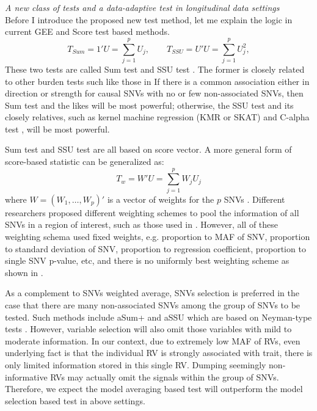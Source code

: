 \documentclass[12pt]{article}
\begin{document}
\textit{A new class of tests and a data-adaptive test in longitudinal data settings}\\
Before I introduce the proposed new test method, let me explain the logic in current GEE and Score test based methods.
$$
T_{Sum} = 1' U = \sum_{j=1}^p U_j, \qquad T_{SSU} = U'U = \sum_{j=1}^p U_j^2,
$$
These two tests are called Sum test and SSU test \cite{Pan2009}. The former is closely related to other burden tests such like those in \cite{Morgenthaler2007,Li2008,Madsen2009} If there is a common association either in direction or strength for causal SNVs with no or few non-associated SNVs, then Sum test and the likes will be most powerful; otherwise, the SSU test and its closely relatives, such as kernel machine regression (KMR or SKAT) \cite{Lee2012,Ionita-Laza2013,Oualkacha2013,Lee2012a,Wu2011} and C-alpha test \cite{Neale2011}, will be most powerful. 

Sum test and SSU test are all based on score vector. A more general form of score-based statistic can be generalized as:
$$
T_w = W' U = \sum_{j=1}^p W_j U_j
$$
where $W = (W_1, \ldots, W_p)'$ is a vector of weights for the $p$ SNVs \cite{Lin2011}. Different researchers proposed different weighting schemes to pool the information of all SNVs in a region of interest, such as those used in \cite{Madsen2009,Sul2011,Pan2011,Han2010,Li2008,Zhang2011,Lin2011,Basu2011}. However, all of these weighting schema used fixed weights, e.g. proportion to MAF of SNV, proportion to standard deviation of SNV, proportion to regression coefficient, proportion to single SNV p-value, etc, and there is no uniformly best weighting scheme as shown in \cite{pan2014powerful,Basu2011,Pan2011}. 

As a complement to SNVs weighted average, SNVs selection is preferred in the case that there are many non-associated SNVs among the group of SNVs to be tested. Such methods include aSum+ and aSSU which are based on Neyman-type tests \cite{Neyman1937}. However, variable selection will also omit those variables with mild to moderate information. In our context, due to extremely low MAF of RVs, even underlying fact is that the individual RV is strongly associated with trait, there is only limited information stored in this single RV. Dumping seemingly non-informative RVs may actually omit the signals within the group of SNVs. Therefore, we expect the model averaging based test will outperform the model selection based test in above settings.
\end{document}
